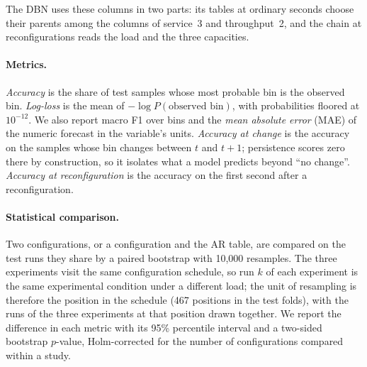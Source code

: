 The DBN uses these columns in two parts: its tables at ordinary seconds choose their parents among the columns of service~3 and throughput~2, and the chain at reconfigurations reads the load and the three capacities.

\paragraph{Metrics.}
\emph{Accuracy} is the share of test samples whose most probable bin is the observed bin.
\emph{Log-loss} is the mean of $-\log P(\text{observed bin})$, with probabilities floored at $10^{-12}$.
We also report macro F1 over bins and the \emph{mean absolute error} (MAE) of the numeric forecast in the variable's units.
\emph{Accuracy at change} is the accuracy on the samples whose bin changes between $t$ and $t+1$; persistence scores zero there by construction, so it isolates what a model predicts beyond ``no change''.
\emph{Accuracy at reconfiguration} is the accuracy on the first second after a reconfiguration.

\paragraph{Statistical comparison.}
Two configurations, or a configuration and the AR table, are compared on the test runs they share by a paired bootstrap with 10{,}000 resamples.
The three experiments visit the same configuration schedule, so run $k$ of each experiment is the same experimental condition under a different load; the unit of resampling is therefore the position in the schedule (467 positions in the test folds), with the runs of the three experiments at that position drawn together.
We report the difference in each metric with its 95\% percentile interval and a two-sided bootstrap $p$-value, Holm-corrected for the number of configurations compared within a study.

